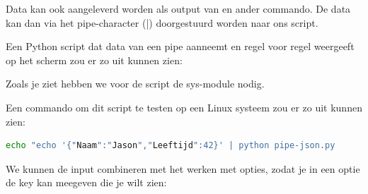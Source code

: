 Data kan ook aangeleverd worden als output van en ander commando. De data kan dan via het pipe-character (|) doorgestuurd worden naar ons script.

Een Python script dat data van een pipe aanneemt en regel voor regel weergeeft op het scherm zou er zo uit kunnen zien:

Zoals je ziet hebben we voor de script de sys-module nodig.

Een commando om dit script te testen op een Linux systeem zou er zo uit kunnen zien:
\begin{lstlisting}[language=bash]
echo "echo '{"Naam":"Jason","Leeftijd":42}' | python pipe-json.py
\end{lstlisting}

We kunnen de input combineren met het werken met opties, zodat je in een optie de key kan meegeven die je wilt zien:



